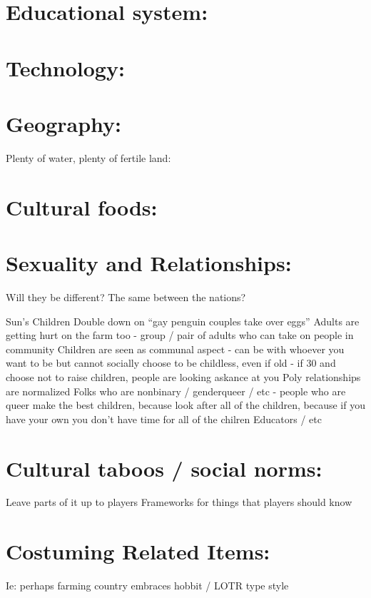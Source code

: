 \documentclass[blue]{GL2020}
\begin{document}
\section{Educational system:}

\section{Technology:}

\section{Geography:}

Plenty of water, plenty of fertile land:

\section{Cultural foods:}

\section{Sexuality and Relationships:}

Will they be different? The same between the nations?

Sun’s Children
Double down on “gay penguin couples take over eggs”
Adults are getting hurt on the farm too - group / pair of adults who can take on people in community
Children are seen as communal aspect - can be with whoever you want to be but cannot socially choose to be childless, even if old - if 30 and choose not to raise children, people are looking askance at you
Poly relationships are normalized
Folks who are nonbinary / genderqueer / etc - people who are queer make the best children, because look after all of the children, because if you have your own you don’t have time for all of the chilren
Educators / etc

\section{Cultural taboos / social norms:}

Leave parts of it up to players
Frameworks for things that players should know

\section{Costuming Related Items:}

Ie: perhaps farming country embraces hobbit / LOTR type style
\end{document}
